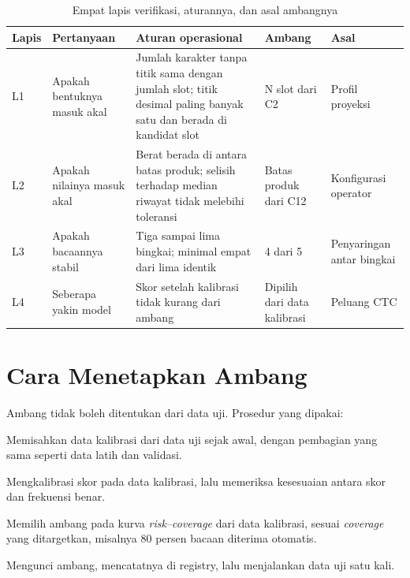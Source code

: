 \documentclass[12pt,a4paper,oneside]{report}
\newcommand{\parencite}[1]{\citep{#1}}
\begin{document}
\begin{table}[H]
\caption{Empat lapis verifikasi, aturannya, dan asal ambangnya}
\label{tab:lapis}
\begin{tabularx}{\textwidth}{@{}L{1.0cm} L{3.0cm} L{4.4cm} L{2.4cm} X@{}}
\toprule
\textbf{Lapis} & \textbf{Pertanyaan} & \textbf{Aturan operasional} & \textbf{Ambang} & \textbf{Asal} \\
\midrule
L1 & Apakah bentuknya masuk akal & Jumlah karakter tanpa titik sama dengan jumlah slot; titik desimal paling banyak satu dan berada di kandidat slot & N slot dari C2 & Profil proyeksi \parencite{jiang2026method} \\
L2 & Apakah nilainya masuk akal & Berat berada di antara batas produk; selisih terhadap median riwayat tidak melebihi toleransi & Batas produk dari C12 & Konfigurasi operator \\
L3 & Apakah bacaannya stabil & Tiga sampai lima bingkai; minimal empat dari lima identik & 4 dari 5 & Penyaringan antar bingkai \parencite{yenneti2023lightweight} \\
L4 & Seberapa yakin model & Skor setelah kalibrasi tidak kurang dari ambang & Dipilih dari data kalibrasi & Peluang CTC \parencite{graves2006ctc} \\
\bottomrule
\end{tabularx}
\end{table}

\section{Cara Menetapkan Ambang}

Ambang tidak boleh ditentukan dari data uji. Prosedur yang dipakai:

\begin{urut}
  \item Memisahkan data kalibrasi dari data uji sejak awal, dengan pembagian
        yang sama seperti data latih dan validasi.
  \item Mengkalibrasi skor pada data kalibrasi, lalu memeriksa kesesuaian antara
        skor dan frekuensi benar.
  \item Memilih ambang pada kurva \textit{risk--coverage} dari data kalibrasi,
        sesuai \textit{coverage} yang ditargetkan, misalnya 80 persen bacaan
        diterima otomatis.
  \item Mengunci ambang, mencatatnya di registry, lalu menjalankan data uji satu
        kali.
\end{urut}
\end{document}
